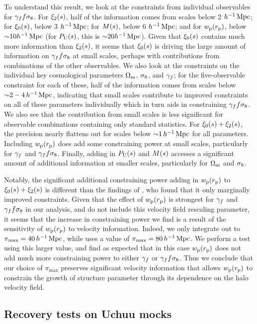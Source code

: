 To understand this result, we look at the constraints from individual observables for $\gamma_f f\sigma_8$.
For $\xi_2(s)$, half of the information comes from scales below 2 $h^{-1}\,\mathrm{Mpc}$; for $\xi_0(s)$, below 3 $h^{-1}\,\mathrm{Mpc}$; for $M(s)$, below 6 $h^{-1}\,\mathrm{Mpc}$; and for $w_\mathrm{p}(r_\mathrm{p})$, below $\mathord{\sim}10 h^{-1}\,\mathrm{Mpc}$ (for $P_\mathrm{U}(s)$, this is $\mathord{\sim}20 h^{-1}\,\mathrm{Mpc}$).
Given that $\xi_0(s)$ contains much more information than $\xi_2(s)$, it seems that $\xi_0(s)$ is driving the large amount of information on $\gamma_f f\sigma_8$ at small scales, perhaps with contributions from combinations of the other observables.
We also look at the constraints on the individual key cosmological parameters $\Omega_\mathrm{m}$, $\sigma_\mathrm{8}$, and $\gamma_f$; for the five-observable constraint for each of these, half of the information comes from scales below $\mathord{\sim} 2-4 \, h^{-1}\,\mathrm{Mpc}$, indicating that small scales contribute to improved constraints on all of these parameters individually which in turn aids in constraining $\gamma_f f\sigma_8$.
We also see that the contribution from small scales is less significant for observable combinations containing only standard statistics. 
For $\xi_0(s) + \xi_2(s)$, the precision nearly flattens out for scales below $\mathord{\sim} 1 \, h^{-1}\,\mathrm{Mpc}$ for all parameters.
Including $w_\mathrm{p}(r_\mathrm{p})$ does add some constraining power at small scales, particularly for $\gamma_f$ and $\gamma_f f\sigma_8$.
Finally, adding in $P_\mathrm{U}(s)$ and $M(s)$ accesses a significant amount of additional information at smaller scales, particularly for $\Omega_\mathrm{m}$ and $\sigma_\mathrm{8}$.

Notably, the significant additional constraining power adding in $w_\mathrm{p}(r_\mathrm{p})$ to $\xi_0(s) + \xi_2(s)$ is different than the findings of \cite{Lange2022}, who found that it only marginally improved constraints.
Given that the effect of $w_\mathrm{p}(r_\mathrm{p})$ is strongest for $\gamma_f$ and $\gamma_f f\sigma_8$ in our analysis, and \cite{Lange2022} do not include this velocity field rescaling parameter, it seems that the increase in constraining power we find is a result of the sensitivity of $w_\mathrm{p}(r_\mathrm{p})$ to velocity information.
Indeed, we only integrate out to $\pi_\mathrm{max}=40\,h^{-1}\,\mathrm{Mpc}$, while \cite{Lange2022} uses a value of $\pi_\mathrm{max}=80\,h^{-1}\,\mathrm{Mpc}$.
We perform a test using this larger value, and find as expected that in this case $w_\mathrm{p}(r_\mathrm{p})$ does not add much more constraining power to either $\gamma_f$ or $\gamma_f f\sigma_8$.
Thus we conclude that our choice of $\pi_\mathrm{max}$ preserves significant velocity information that allows $w_\mathrm{p}(r_\mathrm{p})$ to constrain the growth of structure parameter through its dependence on the halo velocity field.


\subsection{Recovery tests on Uchuu mocks}


